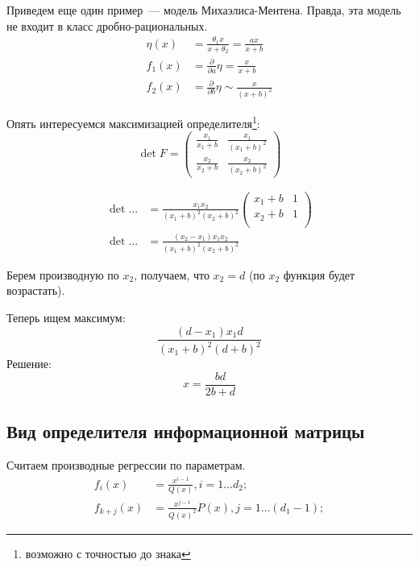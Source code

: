 \begin{ex}
Приведем еще один пример — модель Михаэлиса-Ментена. Правда, эта модель не входит в класс дробно-рациональных.
\begin{equation}
\label{michelMentenModel}
\begin{split}
\eta(x) &= \frac{\theta_1 x}{x+\theta_2} = \frac{ax}{x+b}\\
f_1(x) &= \frac{\partial}{\partial{a}}\eta=\frac{x}{x+b} \\
f_2(x) &= \frac{\partial}{\partial{b}}\eta \sim \frac{x}{(x+b)^2}
\end{split}
\end{equation}

Опять интересуемся максимизацией определителя\footnote{возможно с точностью до знака}:
\begin{equation}
\det F = \begin{pmatrix}
\frac{x_1}{x_1+b} & \frac{x_1}{(x_1+b)^2} \\
\frac{x_2}{x_2+b} & \frac{x_2}{(x_2+b)^2} 
\end{pmatrix}
\end{equation}

\begin{align}
\det … &= \frac{x_1x_2}{(x_1+b)^2(x_2+b)^2}\begin{pmatrix} 
x_1 + b & 1 \\
x_2 + b & 1 \\
\end{pmatrix}\\
\det … &= \frac{(x_2 - x_1) x_1 x_2}{(x_1 + b)^2 (x_2 + b)^2}
\end{align}

Берем производную по $x_2$, получаем, что $x_2 = d$ (по $x_2$ функция будет возрастать).

Теперь ищем максимум:
\begin{equation}
\frac{(d - x_1) x_1 d}{(x_1 + b)^2 (d + b)^2}
\end{equation}
Решение: 
$$x = \frac{bd}{2b + d}$$
\end{ex}


\subsection{Вид определителя информационной матрицы}

Считаем производные регрессии по параметрам.
\begin{align}
f_i(x) &= \frac{x^{i-1}}{Q(x)}, i =1 … d_2; \\
f_{k + j}(x) &= \frac{x^{j-1}}{Q(x)^2}P(x), j = 1…(d_1-1);
\end{align}


